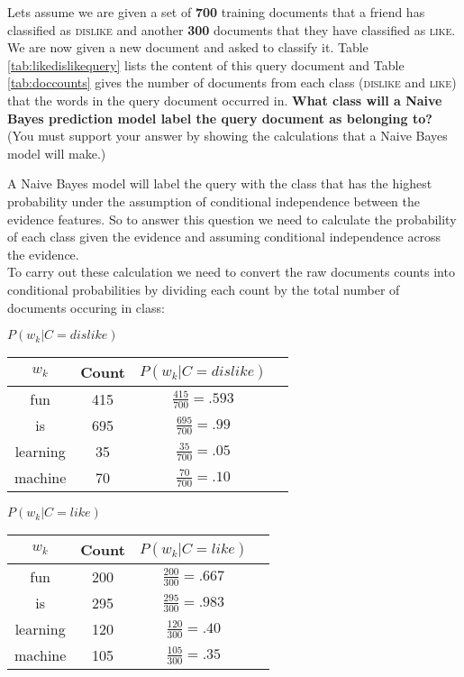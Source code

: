 \documentclass[solution]{ditpaper}
\begin{document}
\question Lets assume we are given a set of \textbf{700} training documents that a friend has classified as \textsc{dislike} and another \textbf{300} documents that they have classified as \textsc{like}. We are now given a new  document and asked to classify it. Table \ref{tab:likedislikequery} lists the content of this query document and Table \ref{tab:doccounts} gives the number of documents from each class (\textsc{dislike} and \textsc{like}) that the words in the query document occurred in. \textbf{What class will a \textbf{Naive Bayes} prediction model label the query document as belonging to?} (You must support your answer by showing the calculations that a Naive Bayes model will make.)
		\begin{answer}
			A Naive Bayes model will label the query with the class that has the highest probability under the assumption of conditional independence between the evidence features. So to answer this question we need to calculate the probability of each class given the evidence and assuming conditional independence across the evidence.\\
			To carry out these calculation we need to convert the raw documents counts into conditional probabilities by dividing each count by the total number of documents occuring in class:
\begin{center}
								\textbf{$P(w_k|C=dislike)$}
								\begin{tabular}{|c|c|c|c|}
								\hline
											$w_k$ & Count & $P(w_k | C=dislike)$\\
												\hline
								 fun & 415 & $\frac{415}{700} = .593$\\
								 			is & 695 & $\frac{695}{700} = .99$\\
											learning & 35 & $\frac{35}{700} = .05$\\
											machine & 70 & $\frac{70}{700} = .10$\\
								\hline
								\end{tabular}
\end{center}
\begin{center}
								\textbf{$P(w_k|C=like)$}										
								\begin{tabular}{|c|c|c|c|}
								\hline
								$w_k$ & Count & $P(w_k | C=like)$\\
												\hline
								 fun & 200 & $\frac{200}{300} = .667$\\
								 is & 295 & $\frac{295}{300} = .983$\\
								learning & 120 & $\frac{120}{300} = .40$\\
								machine & 105 & $\frac{105}{300} = .35$\\
								\hline
								\end{tabular}
\end{center}


\end{answer}
\end{document}
